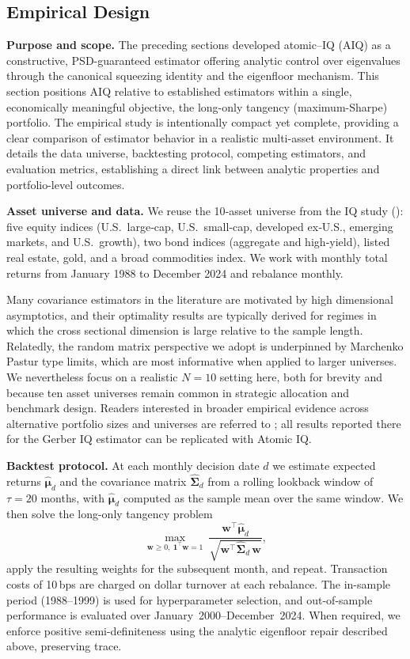 \documentclass[12pt,letterpaper]{article}
\begin{document}
\subsection{Empirical Design}
\noindent\textbf{Purpose and scope.}
\label{sec:empericaldesign}
The preceding sections developed atomic–IQ (AIQ) as a constructive, PSD-guaranteed estimator offering analytic control over eigenvalues through the canonical squeezing identity and the eigenfloor mechanism. This section positions AIQ relative to established estimators within a single, economically meaningful objective, the long-only tangency (maximum-Sharpe) portfolio. The empirical study is intentionally compact yet complete, providing a clear comparison of estimator behavior in a realistic multi-asset environment. It details the data universe, backtesting protocol, competing estimators, and evaluation metrics, establishing a direct link between analytic properties and portfolio-level outcomes.

\vspace{0.35em}
\noindent\textbf{Asset universe and data.}
We reuse the 10‑asset universe from the IQ study (\cite{gerberiqssrn}): five equity indices (U.S.\ large‑cap, U.S.\ small‑cap, developed ex‑U.S., emerging markets, and U.S.\ growth), two bond indices (aggregate and high‑yield), listed real estate, gold, and a broad commodities index. We work with monthly total returns from January 1988 to December 2024 and rebalance monthly.

Many covariance estimators in the literature are motivated by high dimensional asymptotics, and their optimality results are typically derived for regimes in which the cross sectional dimension is large relative to the sample length. Relatedly, the random matrix perspective we adopt is underpinned by Marchenko Pastur type limits, which are most informative when applied to larger universes. We nevertheless focus on a realistic $N=10$ setting here, both for brevity and because ten asset universes remain common in strategic allocation and benchmark design. Readers interested in broader empirical evidence across alternative portfolio sizes and universes are referred to \cite{gerberiqssrn}; all results reported there for the Gerber IQ estimator can be replicated with Atomic IQ.

\vspace{0.35em}
\noindent\textbf{Backtest protocol.}
At each monthly decision date $d$ we estimate expected returns $\hat{\boldsymbol\mu}_d$ and the covariance matrix $\hat{\boldsymbol\Sigma}_d$ from a rolling lookback window of $\tau{=}20$ months, with $\hat{\boldsymbol\mu}_d$ computed as the sample mean over the same window. We then solve the long-only tangency problem
\[
\max_{\mathbf w\ge 0,\ \mathbf 1^\top\mathbf w=1}\ 
\frac{\mathbf w^\top \hat{\boldsymbol\mu}_d}{\sqrt{\mathbf w^\top \hat{\boldsymbol\Sigma}_d\,\mathbf w}},
\]
apply the resulting weights for the subsequent month, and repeat. Transaction costs of 10\,bps are charged on dollar turnover at each rebalance. The in-sample period (1988--1999) is used for hyperparameter selection, and out-of-sample performance is evaluated over January~2000--December~2024. When required, we enforce positive semi-definiteness using the analytic eigenfloor repair described above, preserving trace.
\end{document}
